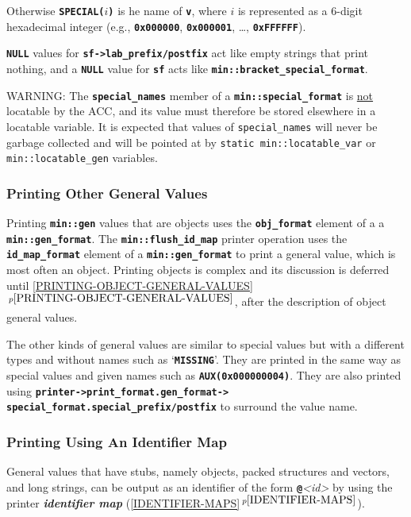 \documentclass[12pt]{article}
\newcommand{\TT}[1]{{\tt \bfseries #1}}
\newcommand{\key}[1]{{\bf \em #1}\index{#1}}
\newcommand{\itemref}[1]{\ref{#1}$\,^{p\pageref{#1}}$}
\newcommand{\EOL}{\penalty \exhyphenpenalty}
\begin{document}
Otherwise
\TT{SPECIAL(}$i$\TT{)} is he name of \TT{v}, where $i$ is represented as
a 6-digit hexadecimal integer (e.g., \TT{0x000000}, \TT{0x000001},
\ldots, \TT{0xFFFFFF}).

\TT{NULL} values for
\TT{sf->\EOL lab\_\EOL prefix/postfix} act like empty strings
that print nothing, and a \TT{NULL} value for \TT{sf} acts like
\TT{min::\EOL bracket\_\EOL special\_\EOL format}.

WARNING: The \TT{special\_\EOL names} member of a \TT{min::special\_format} is
\underline{not} locatable by the ACC, and its value must therefore be
stored elsewhere in a locatable variable.  It is expected that values of
{\tt special\_\EOL names} will never be garbage collected and
will be pointed at by {\tt static min::\EOL locatable\_\EOL var} or
{\tt min::\EOL locatable\_\EOL gen} variables.

\subsubsection{Printing Other General Values}
\label{PRINTING-OTHER-GENERAL-VALUES}

Printing \TT{min::gen} values that are objects
uses the \TT{obj\_\EOL format} element of a
a \TT{min::\EOL gen\_\EOL format}.
The \TT{min::\EOL flush\_\EOL id\_\EOL map} printer operation uses
the \TT{id\_\EOL map\_\EOL format} element of a \TT{min::\EOL gen\_\EOL format}
to print a general value, which is most often an object.
Printing objects is complex and
its discussion is deferred until \itemref{PRINTING-OBJECT-GENERAL-VALUES},
after the description of object general values.

The other kinds of general values are similar to special values but
with a different types and without names such as `\TT{MISSING}'.
They are printed in the same way as special values and given
names such as \TT{AUX(0x000000004)}.  They are also printed using
\TT{printer->\EOL print\_\EOL format.gen\_\EOL format->\EOL
special\_\EOL format.special\_\EOL prefix/\EOL postfix}
to surround the value name.


\subsubsection{Printing Using An Identifier Map}
\label{PRINTING-USING-AN-IDENTIFIER-MAP}

General values that have stubs, namely objects, packed structures and vectors,
and long strings, can be
output as an identifier of the form \TT{@}{\em <id>} by using
the printer \key{identifier map} (\itemref{IDENTIFIER-MAPS}).
\end{document}
